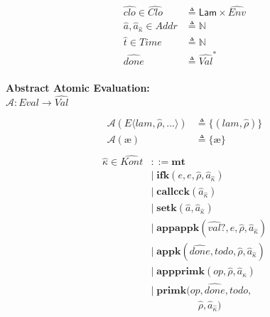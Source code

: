 \documentclass[12pt,draft]{article}
\newcommand\mae{\ensuremath{\text{\ae}}}
\begin{document}
\begin{multicols*}{2}
\begin{align*}
    \widehat{clo} \in \widehat{\textit{Clo}}
    &\triangleq \textsf{Lam} \times \widehat{\textit{Env}} \\
    \hat{a},\hat{a}_{\hat{\kappa}} \in \textit{Addr} &\triangleq \mathbb{N} \\
    \hat{t} \in \textit{Time} &\triangleq \mathbb{N} \\
    \widehat{done} &\triangleq \widehat{\textit{Val}}^* \\
  \end{align*}
  \begin{center}
    \textbf{Abstract Atomic Evaluation:} \\
    $\mathcal{A} : \textit{Eval} \rightarrow \widehat{\textit{Val}}$
  \end{center}
  \vspace{-7mm}
  \begin{align*}
    \mathcal{A}(E\langle lam , \hat{\rho} , ... \rangle)
    &\triangleq \{ (lam , \hat{\rho}) \} \\
    \mathcal{A}(\mae)
    &\triangleq \{\mae\} \\
  \end{align*}
  \vfill\null
  \columnbreak
  \begin{align*}
    \hat{\kappa} \in \widehat{\textit{Kont}} &::= \textbf{mt} \\
    &|\; \textbf{ifk}(e, e, \hat{\rho}, \hat{a}_{\hat{\kappa}}) \\
    &|\; \textbf{callcck}(\hat{a}_{\hat\kappa}) \\
    &|\; \textbf{setk}(\hat{a}, \hat{a}_{\hat{\kappa}}) \\
    &|\; \textbf{appappk}(\widehat{val}?, e, \hat{\rho}, \hat{a}_{\hat\kappa}) \\
    &|\; \textbf{appk}(\widehat{done}, todo, \hat{\rho}, \hat{a}_{\hat\kappa}) \\
    &|\; \textbf{appprimk}(op, \hat{\rho}, \hat{a}_{\hat\kappa}) \\
    &|\; \textbf{primk}(op, \widehat{done}, todo, \\
    &\;\;\;\;\;\;\;\;\;\;\;\;\;\;\;\;\;\hat{\rho}, \hat{a}_{\hat\kappa}) \\

\end{align*}
\end{multicols*}
\end{document}
